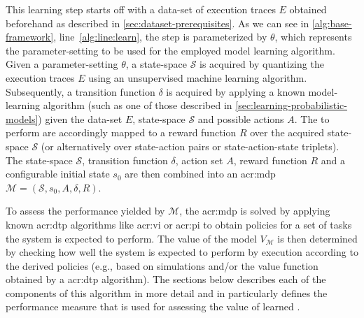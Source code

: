 This learning step starts off with a data-set of execution traces $E$ obtained beforehand as described in \autoref{sec:dataset-prerequisites}.
As we can see in \autoref{alg:base-framework}, line~\ref{alg:line:learn}, the step is parameterized by $\theta$, which represents the parameter-setting to be used for the employed model learning algorithm.
Given a parameter-setting $\theta$, a state-space $\mathcal{S}$ is acquired by quantizing the execution traces $E$ using an unsupervised machine learning algorithm.
Subsequently, a transition function $\delta$ is acquired by applying a known model-learning algorithm (such as one of those described in \autoref{sec:learning-probabilistic-models}) given the data-set $E$, state-space $\mathcal{S}$ and possible actions $A$.
The to perform are accordingly mapped to a reward function $R$ over the acquired state-space $\mathcal{S}$ (or alternatively over state-action pairs or state-action-state triplets).
The state-space $\mathcal{S}$, transition function $\delta$, action set $A$, reward function $R$ and a configurable initial state $s_0$ are then combined into an \acrshort{acr:mdp} $\mathcal{M} = (\mathcal{S}, s_0, A, \delta, R)$.

To assess the performance yielded by $\mathcal{M}$, the \acrshort{acr:mdp} is solved by applying known \acrshort{acr:dtp} algorithms like \acrshort{acr:vi} or \acrshort{acr:pi} to obtain policies for a set of tasks the system is expected to perform.
The value of the model $V_{\mathcal{M}}$ is then determined by checking how well the system is expected to perform by execution according to the derived policies (e.g., based on simulations and/or the value function obtained by a \acrshort{acr:dtp} algorithm).
The sections below describes each of the components of this algorithm in more detail and in particularly defines the performance measure that is used for assessing the value of learned .


